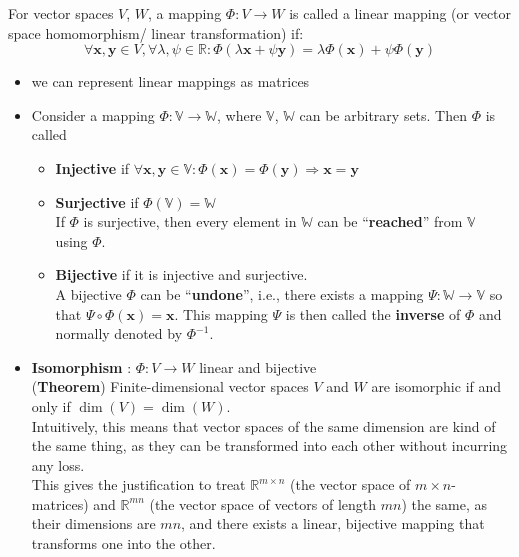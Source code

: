 For vector spaces $V$, $W$, a mapping $\Phi : V \rightarrow W$ is called a linear mapping (or vector space homomorphism/ linear transformation) if:
\[
    \forall \mathbf{x, y} \in V, \forall\lambda, \psi \in \mathbb{R} : \Phi(\lambda\mathbf{x} + \psi\mathbf{y}) = \lambda\Phi(\mathbf{x}) + \psi\Phi(\mathbf{y})
\]

\begin{itemize}
    \item we can represent linear mappings as matrices
    \item Consider a mapping $\Phi : \mathbb{V} \rightarrow \mathbb{W}$, where $\mathbb{V}$, $\mathbb{W}$ can be arbitrary sets. Then $\Phi$ is called
    \begin{itemize}
        \item \textbf{Injective} if $\forall \mathbf{x, y} \in \mathbb{V}: \Phi(\mathbf{x}) = \Phi(\mathbf{y}) \Rightarrow \mathbf{x} = \mathbf{y}$ \label{Injective mapping}

        \item \textbf{Surjective} if $\Phi(\mathbb{V}) = \mathbb{W}$\label{Surjective mapping}\\
        If $\Phi$ is surjective, then every element in $\mathbb{W}$ can be “\textbf{reached}” from $\mathbb{V}$ using $\Phi$.

        \item \textbf{Bijective} if it is injective and surjective.\label{Bijective mapping}\\
        A bijective $\Phi$ can be “\textbf{undone}”, i.e., there exists a mapping $\Psi : \mathbb{W} \rightarrow \mathbb{V}$ so that $\Psi \circ \Phi(\textbf{x}) = \textbf{x}$. This mapping $\Psi$ is then called the \textbf{inverse} of $\Phi$ and normally denoted by $\Phi^{-1}$.\label{inverse linear mapping}
        
    \end{itemize}

    \item \textbf{Isomorphism} \label{Isomorphism}: $\Phi : V \rightarrow W$ linear and bijective\\
    (\textbf{Theorem}) Finite-dimensional vector spaces $V$ and $W$ are isomorphic if and only if $\dim(V) = \dim(W)$.\\
    Intuitively, this means that vector spaces of the same dimension are kind of the same thing, as they can be transformed into each other without incurring any loss.\\
    This gives the justification to treat $\mathbb{R}^{m\times n}$ (the vector space of ${m\times n}$-matrices) and $\mathbb{R}^{mn}$ (the vector space of vectors of length $mn$) the same, as their dimensions are $mn$, and there exists a linear, bijective mapping that transforms one into the other.


\end{itemize}
